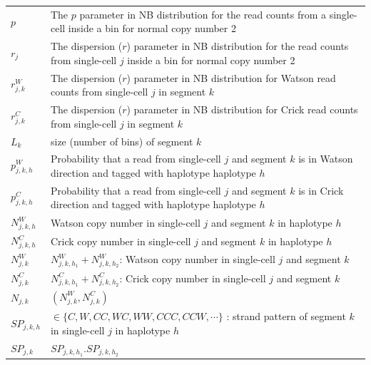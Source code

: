 \documentclass[12pt]{article}
\renewcommand{\j}{j} %
\renewcommand{\k}{k} %
\newcommand{\h}{h} %
\newcommand{\N}{N} %
\begin{document}
\begin{table}[tb]
\begin{tabular}{  p{4cm} p{12.5cm} }
		$p$ & The $p$ parameter in NB distribution for the read counts from a single-cell inside a bin for normal copy number 2\\
		
		$r_\j$ & The dispersion ($r$) parameter in NB distribution for the read counts from single-cell $\j$ inside a bin for normal copy number 2\\
		
		$r_{\j,\k}^W$ & The dispersion ($r$) parameter in NB distribution for Watson read counts from single-cell $\j$ in segment $\k$\\
		
		$r_{\j,\k}^C$ & The dispersion ($r$) parameter in NB distribution for Crick read counts from single-cell $\j$ in segment $\k$\\
		
		$L_\k$ & size (number of bins) of segment $\k$\\
		
        $p_{\j, \k, \h}^W$ & Probability that a read from single-cell $\j$ and segment $\k$ is in Watson direction and tagged with haplotype haplotype $\h$\\
		
		$p_{\j, \k, \h}^C$ & Probability that a read from single-cell $\j$ and segment $\k$ is in Crick direction and tagged with haplotype haplotype $\h$\\
		
		$\N_{\j, \k, \h}^W$ & Watson copy number in single-cell $\j$ and segment $\k$ in haplotype $\h$\\
		
		$\N_{\j, \k, \h}^C$ & Crick copy number in single-cell $\j$ and segment $\k$ in haplotype $\h$\\
		
		$\N_{\j,\k}^W$ & $\N_{\j, \k, \h_1}^W + \N_{\j, \k, \h_2}^W$: Watson copy number in single-cell $\j$ and segment $\k$\\
		
		$\N_{\j,\k}^C$ & $\N_{\j, \k, \h_1}^C + \N_{\j, \k, \h_2}^C$: Crick copy number in single-cell $\j$ and segment $\k$\\
		
		$\N_{\j, \k}$ & $(\N_{\j, \k}^W, \N_{\j, \k}^C)$\\
		
		$SP_{\j,\k, \h}$ & $\in \{C,W,CC,WC,WW,CCC,CCW, \cdots\}$ : strand pattern of segment $\k$ in single-cell $\j$ in haplotype $\h$\\
		
		$SP_{\j,\k}$ & $SP_{\j, \k, \h_1}.SP_{\j, \k, \h_2}$\\
		\hline
	\end{tabular}
	\label{notations}\vspace{-4.5mm}
\end{table}
\end{document}
